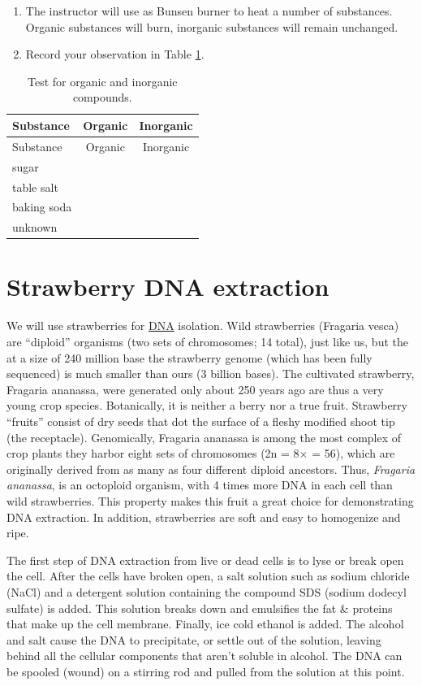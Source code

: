 \begin{enumerate}
\def\labelenumi{\arabic{enumi}.}
\tightlist
\item
  The instructor will use as Bunsen burner to heat a number of
  substances. Organic substances will burn, inorganic substances will
  remain unchanged.
\item
  Record your observation in Table \ref{tab:organic}.
\end{enumerate}

\begin{longtable}[]{@{}lcc@{}}
\caption{\label{tab:organic} Test for organic and inorganic
compounds.}\tabularnewline
\toprule
Substance & Organic & Inorganic\tabularnewline
\midrule
\endfirsthead
\toprule
Substance & Organic & Inorganic\tabularnewline
\midrule
\endhead
sugar & &\tabularnewline
table salt & &\tabularnewline
baking soda & &\tabularnewline
unknown & &\tabularnewline
\bottomrule
\end{longtable}

\section{Strawberry DNA extraction}\label{strawberry-dna-extraction}

We will use strawberries for
\href{https://en.wikipedia.org/wiki/DNA}{DNA} isolation. Wild
strawberries (Fragaria vesca) are ``diploid'' organisms (two sets of
chromosomes; 14 total), just like us, but the at a size of 240 million
base the strawberry genome (which has been fully sequenced) is much
smaller than ours (3 billion bases). The cultivated strawberry, Fragaria
ananassa, were generated only about 250 years ago are thus a very young
crop species. Botanically, it is neither a berry nor a true fruit.
Strawberry ``fruits'' consist of dry seeds that dot the surface of a
fleshy modified shoot tip (the receptacle). Genomically, Fragaria
ananassa is among the most complex of crop plants they harbor eight sets
of chromosomes (2n = 8× = 56), which are originally derived from as many
as four different diploid ancestors. Thus, \emph{Fragaria ananassa}, is
an octoploid organism, with 4 times more DNA in each cell than wild
strawberries. This property makes this fruit a great choice for
demonstrating DNA extraction. In addition, strawberries are soft and
easy to homogenize and ripe.

The first step of DNA extraction from live or dead cells is to lyse or
break open the cell. After the cells have broken open, a salt solution
such as sodium chloride (NaCl) and a detergent solution containing the
compound SDS (sodium dodecyl sulfate) is added. This solution breaks
down and emulsifies the fat \& proteins that make up the cell membrane.
Finally, ice cold ethanol is added. The alcohol and salt cause the DNA
to precipitate, or settle out of the solution, leaving behind all the
cellular components that aren't soluble in alcohol. The DNA can be
spooled (wound) on a stirring rod and pulled from the solution at this
point.

